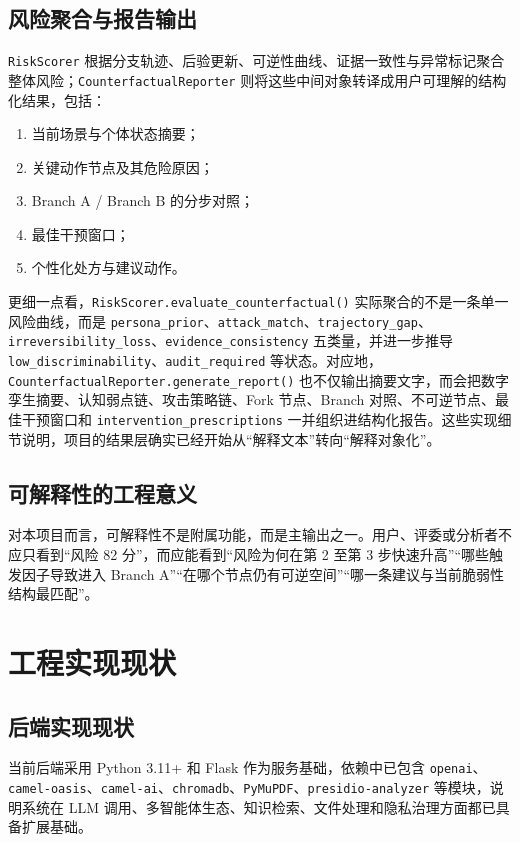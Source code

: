 \documentclass[12pt,a4paper]{ctexart}
\begin{document}
\subsection{风险聚合与报告输出}

\texttt{RiskScorer} 根据分支轨迹、后验更新、可逆性曲线、证据一致性与异常标记聚合整体风险；\texttt{CounterfactualReporter} 则将这些中间对象转译成用户可理解的结构化结果，包括：
\begin{enumerate}[leftmargin=2em]
  \item 当前场景与个体状态摘要；
  \item 关键动作节点及其危险原因；
  \item Branch A / Branch B 的分步对照；
  \item 最佳干预窗口；
  \item 个性化处方与建议动作。
\end{enumerate}

更细一点看，\texttt{RiskScorer.evaluate\_counterfactual()} 实际聚合的不是一条单一风险曲线，而是 \texttt{persona\_prior}、\texttt{attack\_match}、\texttt{trajectory\_gap}、\texttt{irreversibility\_loss}、\texttt{evidence\_consistency} 五类量，并进一步推导 \texttt{low\_discriminability}、\texttt{audit\_required} 等状态。对应地，\texttt{CounterfactualReporter.generate\_report()} 也不仅输出摘要文字，而会把数字孪生摘要、认知弱点链、攻击策略链、Fork 节点、Branch 对照、不可逆节点、最佳干预窗口和 \texttt{intervention\_prescriptions} 一并组织进结构化报告。这些实现细节说明，项目的结果层确实已经开始从“解释文本”转向“解释对象化”。

\subsection{可解释性的工程意义}

对本项目而言，可解释性不是附属功能，而是主输出之一。用户、评委或分析者不应只看到“风险 82 分”，而应能看到“风险为何在第 2 至第 3 步快速升高”“哪些触发因子导致进入 Branch A”“在哪个节点仍有可逆空间”“哪一条建议与当前脆弱性结构最匹配”。

\section{工程实现现状}

\subsection{后端实现现状}

当前后端采用 Python 3.11+ 和 Flask 作为服务基础，依赖中已包含 \texttt{openai}、\texttt{camel-oasis}、\texttt{camel-ai}、\texttt{chromadb}、\texttt{PyMuPDF}、\texttt{presidio-analyzer} 等模块，说明系统在 LLM 调用、多智能体生态、知识检索、文件处理和隐私治理方面都已具备扩展基础。
\end{document}
